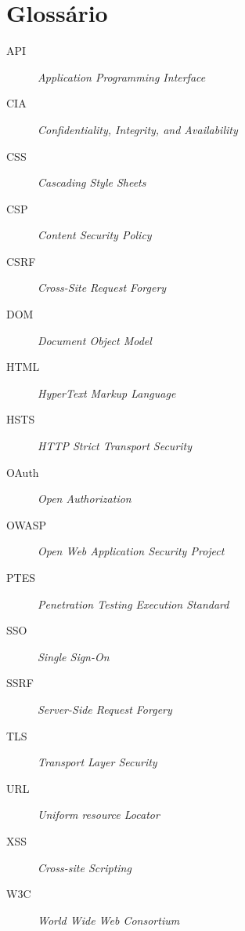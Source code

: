 \section*{Glossário} %

\begin{description}
\item[API] \textit{Application Programming Interface}
\item[CIA] \textit{Confidentiality, Integrity, and Availability}
\item[CSS] \textit{Cascading Style Sheets}
\item[CSP] \textit{Content Security Policy}
\item[CSRF] \textit{Cross-Site Request Forgery}
\item[DOM] \textit{Document Object Model}
\item[HTML] \textit{HyperText Markup Language}
\item[HSTS] \textit{HTTP Strict Transport Security}
\item[OAuth] \textit{Open Authorization}
\item[OWASP] \textit{Open Web Application Security Project}
\item[PTES] \textit{Penetration Testing Execution Standard}
\item[SSO] \textit{Single Sign-On}
\item[SSRF] \textit{Server-Side Request Forgery}
\item[TLS] \textit{Transport Layer Security}
\item[URL] \textit{Uniform resource Locator}
\item[XSS] \textit{Cross-site Scripting}
\item[W3C] \textit{World Wide Web Consortium}
\end{description}